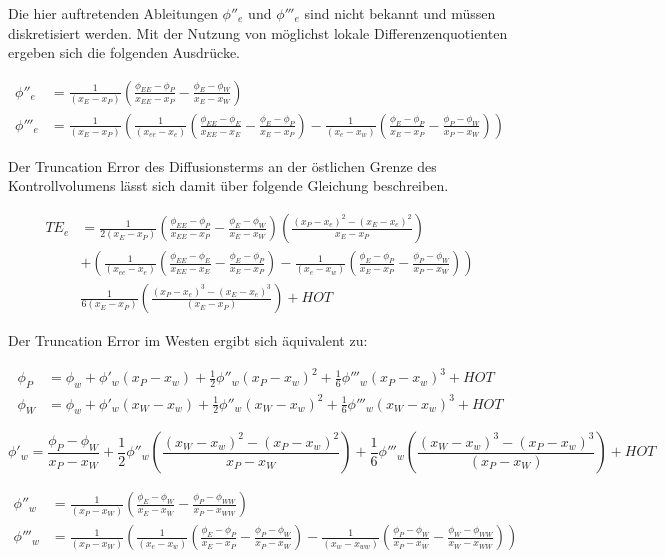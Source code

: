 \documentclass[11pt, ngerman,colorback,accentcolor=tud2d]{tudreport}
\begin{document}
Die hier auftretenden Ableitungen $\phi''_e$ und $\phi'''_e$ sind nicht bekannt und 
müssen diskretisiert werden. Mit der Nutzung von
möglichst lokale Differenzenquotienten ergeben sich die folgenden Ausdrücke.

\begin{align*}
  \phi''_e &= \frac{1}{(x_E-x_P)}\left({
\frac{\phi_{EE}-\phi_P}{x_{EE}-x_P}-\frac{\phi_E-\phi_W}{x_E-x_W}}\right)\\
\phi'''_e &= \frac{1}{(x_E-x_P)}\left({
\frac{1}{(x_{ee}-x_e)}
\left({\frac{\phi_{EE}-\phi_E}{x_{EE}-x_E}-\frac{\phi_E-\phi_P}{x_E-x_P} }\right)
-\frac{1}{(x_e-x_w)}
\left({\frac{\phi_E-\phi_P}{x_E-x_P} - \frac{\phi_P-\phi_W}{x_P-x_W}  }\right)
}\right)
\end{align*}


Der Truncation Error des Diffusionsterms an der östlichen Grenze des Kontrollvolumens
lässt sich damit über folgende Gleichung beschreiben.

\begin{align*}
  {TE}_e &= \frac{1}{2 (x_E-x_P)}\left({
\frac{\phi_{EE}-\phi_P}{x_{EE}-x_P}-\frac{\phi_E-\phi_W}{x_E-x_W}}\right) \left({\frac{{(x_P-x_e)}^2-{(x_E-x_e)}^2}{x_E-x_P}}\right)\\
&+
\left({
\frac{1}{(x_{ee}-x_e)}
\left({\frac{\phi_{EE}-\phi_E}{x_{EE}-x_E}-\frac{\phi_E-\phi_P}{x_E-x_P} }\right)
-\frac{1}{(x_e-x_w)}
\left({\frac{\phi_E-\phi_P}{x_E-x_P} - \frac{\phi_P-\phi_W}{x_P-x_W}  }\right)
}\right)\\
&\frac{1}{6(x_E-x_P)}\left({\frac{{(x_P-x_e)}^3-{(x_E-x_e)}^3}{(x_E-x_P)}}\right)
+HOT
\end{align*}

Der Truncation Error im Westen ergibt sich äquivalent zu:

\begin{align*}
  \phi_P &= \phi_w + \phi'_w(x_P-x_w)+\frac{1}{2}\phi''_w(x_P-x_w)^2
  +\frac{1}{6}\phi'''_w(x_P-x_w)^3+HOT\\
  \phi_W &= \phi_w + \phi'_w(x_W-x_w)+\frac{1}{2}\phi''_w(x_W-x_w)^2
  +\frac{1}{6}\phi'''_w(x_W-x_w)^3+HOT
\end{align*}

\begin{equation}
  \phi'_w = \frac{\phi_P-\phi_W}{x_P-x_W}+\frac{1}{2}\phi''_w
\left({\frac{{(x_W-x_w)}^2-{(x_P-x_w)}^2}{x_P-x_W}}\right)+
\frac{1}{6} \phi'''_w \left({\frac{{(x_W-x_w)}^3-{(x_P-x_w)}^3}{(x_P-x_W)}}\right)+HOT
\end{equation}

\begin{align*}
  \phi''_w &= \frac{1}{(x_P-x_W)}\left({
\frac{\phi_{E}-\phi_W}{x_{E}-x_W}-\frac{\phi_P-\phi_{WW}}{x_P-x_{WW}}}\right)\\
 \phi'''_w &= \frac{1}{(x_P-x_W)}\left({
\frac{1}{(x_e-x_w)}
\left({\frac{\phi_E-\phi_P}{x_E-x_P}-\frac{\phi_P-\phi_W}{x_P-x_W} }\right)
-\frac{1}{(x_w-x_{ww})}
\left({\frac{\phi_P-\phi_W}{x_P-x_W} - \frac{\phi_W-\phi_{WW}}{x_W-x_{WW}}  }\right)
}\right)
\end{align*}
\end{document}

